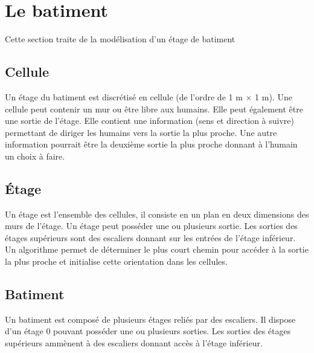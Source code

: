 %
\section{Le batiment}
%
Cette section traite de la modélisation d'un étage de batiment
%
\subsection{Cellule}
Un étage du batiment est discrétisé en cellule (de l'ordre de 1 m $\times$ 1 m). Une cellule peut contenir un mur ou être libre aux humains. Elle peut également être une sortie de l'étage. Elle contient une information (sens et direction à suivre) permettant de diriger les humains vers la sortie la plus proche. Une autre information pourrait être la deuxième sortie la plus proche donnant à l'humain un choix à faire.
%
%
\subsection{Étage}
Un étage est l'ensemble des cellules, il consiste en un plan en deux dimensions des murs de l'étage. Un étage peut posséder une ou plusieurs sortie. Les sorties des étages supérieurs sont des escaliers donnant sur les entrées de l'étage inférieur. Un algorithme permet de déterminer le plus court chemin pour accéder à la sortie la plus proche et initialise cette orientation dans les cellules.
%
%
\subsection{Batiment}
Un batiment est composé de plusieurs étages reliés par des escaliers. Il dispose d'un étage 0 pouvant posséder une ou plusieurs sorties. Les sorties des étages supérieurs ammènent à des escaliers donnant accès à l'étage inférieur.
